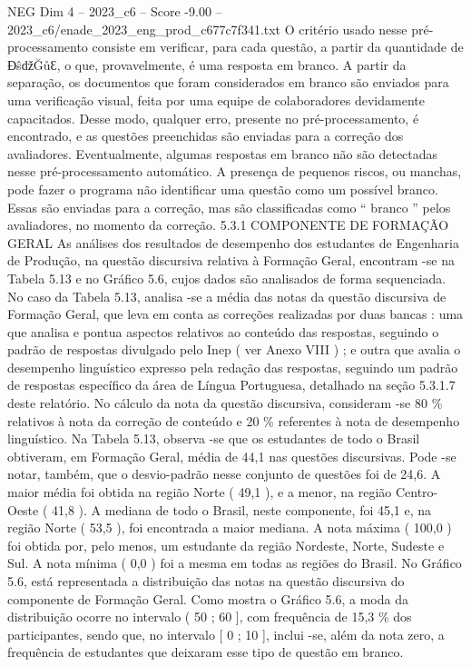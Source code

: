 \begin{textsample}{NEG Dim 4 – 2023\_c6 – Score -9.00 – 2023\_c6/enade\_2023\_eng\_prod\_c677c7f341.txt}
O critério usado nesse pré-processamento consiste em verificar, para cada questão, a partir da quantidade de ƉŝǆĞůƐ, o que, provavelmente, é uma resposta em branco.
A partir da separação, os documentos que foram considerados em branco são enviados para uma verificação visual, feita por uma equipe de colaboradores devidamente capacitados.
Desse modo, qualquer erro, presente no pré-processamento, é encontrado, e as questões preenchidas são enviadas para a correção dos avaliadores.
Eventualmente, algumas respostas em branco não são detectadas nesse pré-processamento automático.
A presença de pequenos riscos, ou manchas, pode fazer o programa não identificar uma questão como um possível branco.
Essas são enviadas para a correção, mas são classificadas como “ branco ” pelos avaliadores, no momento da correção. 5.3.1 COMPONENTE DE FORMAÇÃO GERAL As análises dos resultados de desempenho dos estudantes de Engenharia de Produção, na questão discursiva relativa à Formação Geral, encontram -se na Tabela 5.13 e no Gráfico 5.6, cujos dados são analisados de forma sequenciada.
No caso da Tabela 5.13, analisa -se a média das notas da questão discursiva de Formação Geral, que leva em conta as correções realizadas por duas bancas : uma que analisa e pontua aspectos relativos ao conteúdo das respostas, seguindo o padrão de respostas divulgado pelo Inep ( ver Anexo VIII ) ; e outra que avalia o desempenho linguístico expresso pela redação das respostas, seguindo um padrão de respostas específico da área de Língua Portuguesa, detalhado na seção 5.3.1.7 deste relatório.
No cálculo da nota da questão discursiva, consideram -se 80 \% relativos à nota da correção de conteúdo e 20 \% referentes à nota de desempenho linguístico.
Na Tabela 5.13, observa -se que os estudantes de todo o Brasil obtiveram, em Formação Geral, média de 44,1 nas questões discursivas.
Pode -se notar, também, que o desvio-padrão nesse conjunto de questões foi de 24,6.
A maior média foi obtida na região Norte ( 49,1 ), e a menor, na região Centro-Oeste ( 41,8 ).
A mediana de todo o Brasil, neste componente, foi 45,1 e, na região Norte ( 53,5 ), foi encontrada a maior mediana.
A nota máxima ( 100,0 ) foi obtida por, pelo menos, um estudante da região Nordeste, Norte, Sudeste e Sul.
A nota mínima ( 0,0 ) foi a mesma em todas as regiões do Brasil.
No Gráfico 5.6, está representada a distribuição das notas na questão discursiva do componente de Formação Geral.
Como mostra o Gráfico 5.6, a moda da distribuição ocorre no intervalo ( 50 ; 60 ], com frequência de 15,3 \% dos participantes, sendo que, no intervalo [ 0 ; 10 ], inclui -se, além da nota zero, a frequência de estudantes que deixaram esse tipo de questão em branco.

\end{textsample}
